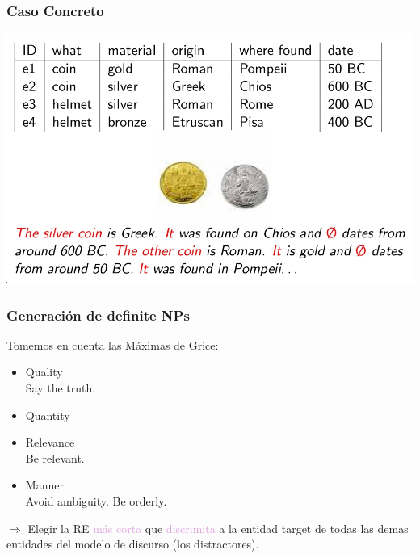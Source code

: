 \documentclass[compress,color=usenames]{beamer}
\newcommand{\mH}[1]{\textcolor{Plum}{#1}}
\newcommand{\mT}[1]{\textcolor{Periwinkle}{#1}}
\begin{document}
\begin{frame}
\frametitle{Caso Concreto}

\vspace*{-.5cm}
\begin{center}
\includegraphics[scale=.45]{pics/pic3-21.jpg}
\end{center}

\end{frame}

\begin{frame}
\frametitle{Generaci\'on de definite NPs}

Tomemos en cuenta las M\'aximas de Grice:

\begin{itemize}

\item \mT{Quality}\\
Say the truth.

\item \mT{Quantity}\\
\only<2->{\mH{Be as informative as possible.}}

\item \mT{Relevance}\\
Be relevant.

\item \mT{Manner}\\
\only<2->{\mH{Be brief.}} Avoid ambiguity. Be orderly.\pause\pause

\end{itemize}

$\Rightarrow$ Elegir la RE \mH{m\'as corta} que \mH{discrimita} a
la entidad target de todas las demas entidades del modelo de discurso 
(los distractores). 

\end{frame}
\end{document}
